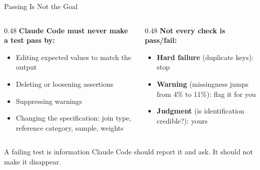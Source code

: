 \documentclass[aspectratio=169, 11pt]{beamer}
\begin{document}
\begin{frame}{Passing Is Not the Goal}
  \begin{columns}[T]
    \begin{column}{0.48\textwidth}
      \textbf{Claude Code must never make a test pass by:}
      \begin{itemize}
        \small
        \item Editing expected values to match the output
        \item Deleting or loosening assertions
        \item Suppressing warnings
        \item Changing the specification: join type, reference category, sample, weights
      \end{itemize}
    \end{column}
    \begin{column}{0.48\textwidth}
      \textbf{Not every check is pass/fail:}
      \begin{itemize}
        \small
        \item \textbf{Hard failure} (duplicate keys): stop
        \item \textbf{Warning} (missingness jumps from 4\% to 11\%): flag it for you
        \item \textbf{Judgment} (is identification credible?): yours
      \end{itemize}
    \end{column}
  \end{columns}

  \vspace{0.8em}
  \begin{alertblock}{A failing test is information}
    Claude Code should report it and ask. It should not make it disappear.
  \end{alertblock}
\end{frame}

\end{document}

